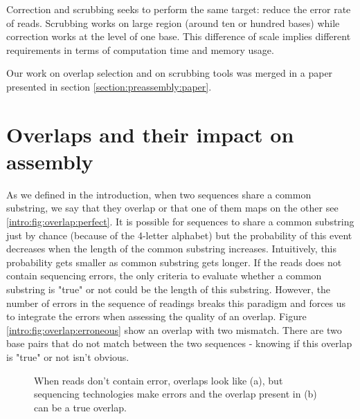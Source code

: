 \documentclass[main.tex]{subfiles}
\begin{document}
Correction and scrubbing seeks to perform the same target: reduce the error rate of reads. Scrubbing works on large region (around ten or hundred bases) while correction works at the level of one base. This difference of scale implies different requirements in terms of computation time and memory usage.

Our work on overlap selection and on scrubbing tools was merged in a paper presented in section \ref{section:preassembly:paper}.

\section{Overlaps and their impact on assembly} \label{sec:preasm:ovl}

As we defined in the introduction, when two sequences share a common substring, we say that they overlap or that one of them maps on the other see \ref{intro:fig:overlap:perfect}. It is possible for sequences to share a common substring just by chance (because of the 4-letter alphabet) but the probability of this event decreases when the length of the common substring increases. Intuitively, this probability gets smaller as common substring gets longer. If the reads does not contain sequencing errors, the only criteria to evaluate whether a common substring is "true" or not could be the length of this substring. However, the number of errors in the sequence of readings breaks this paradigm and forces us to integrate the errors when assessing the quality of an overlap. Figure \ref{intro:fig:overlap:erroneous} show an overlap with two mismatch. There are two base pairs that do not match between the two sequences - knowing if this overlap is "true" or not isn't obvious.


\begin{figure}[ht]
    \centering
    \caption{When reads don't contain error, overlaps look like (a), but sequencing technologies make errors and the overlap present in (b) can be a true overlap.}
    \label{intro:fig:overlap}
\end{figure}
\end{document}
